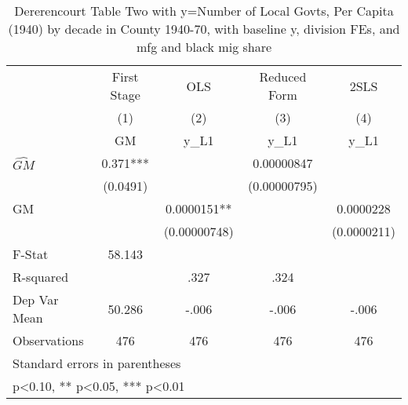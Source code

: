 \begin{table}[htbp]\centering
\def\sym#1{\ifmmode^{#1}\else\(^{#1}\)\fi}
\caption{Dererencourt Table Two with y=Number of Local Govts, Per Capita (1940) by decade in County 1940-70, with baseline y, division FEs, and mfg and black mig share}
\begin{tabular}{l*{4}{c}}
\toprule
                    & First Stage   &         OLS   &Reduced Form   &        2SLS   \\
                    &\multicolumn{1}{c}{(1)}&\multicolumn{1}{c}{(2)}&\multicolumn{1}{c}{(3)}&\multicolumn{1}{c}{(4)}\\
                    &\multicolumn{1}{c}{GM}&\multicolumn{1}{c}{y\_L1}&\multicolumn{1}{c}{y\_L1}&\multicolumn{1}{c}{y\_L1}\\
\midrule
$\hat{GM}$          &       0.371***&               &  0.00000847   &               \\
                    &    (0.0491)   &               &(0.00000795)   &               \\
\addlinespace
GM                  &               &   0.0000151** &               &   0.0000228   \\
                    &               &(0.00000748)   &               & (0.0000211)   \\
\midrule
F-Stat              &      58.143   &               &               &               \\
R-squared           &               &        .327   &        .324   &               \\
Dep Var Mean        &      50.286   &       -.006   &       -.006   &       -.006   \\
Observations        &         476   &         476   &         476   &         476   \\
\bottomrule
\multicolumn{5}{l}{\footnotesize Standard errors in parentheses}\\
\multicolumn{5}{l}{\footnotesize * p<0.10, ** p<0.05, *** p<0.01}\\
\end{tabular}
\end{table}
